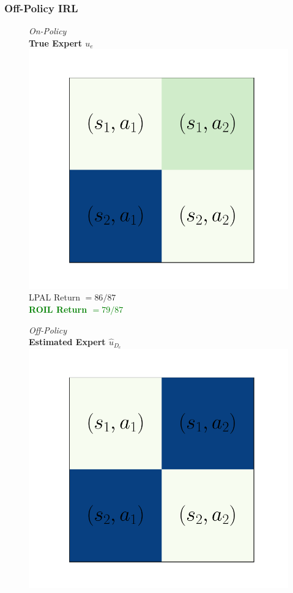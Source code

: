 \documentclass{beamer}
\begin{document}
\begin{frame}
\frametitle{Off-Policy IRL}
\begin{figure}
  \begin{center}
  \begin{minipage}{0.45\linewidth}
    \centering
    \emph{On-Policy}\\
    \textbf{True Expert $u_e$}
    \includegraphics[width=\linewidth]{./plots/all_state/ue.pdf}
    LPAL Return $= 86/87$ \\
    \textcolor{green}{\textbf{ROIL Return $= 79/87$}}
  \end{minipage}
  \begin{minipage}{0.45\linewidth}
    \centering
    \emph{Off-Policy}\\
    \textbf{Estimated Expert $\hat{u}_{D_e}$}
    \includegraphics[width=\linewidth]{./plots/all_state/uehat.pdf}

\end{minipage}
\end{center}
\end{figure}
\end{frame}
\end{document}
